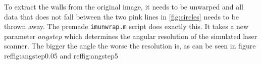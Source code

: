 \documentclass[a4paper, 20pt]{article}
\begin{document}
\begin{figure}[!ht]
\centering
\begin{floatrow}
  
\end{floatrow}
\end{figure}


To extract the walls from the original image, it needs to be unwarped and all
data that does not fall between the two pink lines in \ref{fig:circles} needs to
be thrown away. The premade \texttt{imunwrap.m} script does exactly this. It
takes a new parameter $angstep$ which determines the angular resolution of the
simulated laser scanner. The bigger the angle the worse the resolution is, as
can be seen in figure ref{fig:angstep0.05} and ref{fig:angstep5}
\end{document}
